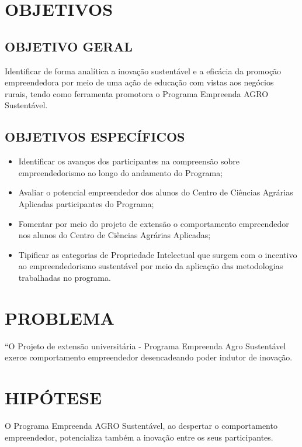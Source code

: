 \section{OBJETIVOS}

\subsection{OBJETIVO GERAL}

Identificar de forma analítica a inovação sustentável e a eficácia da promoção empreendedora por meio de uma ação de educação com vistas aos negócios rurais, tendo como ferramenta promotora o Programa Empreenda AGRO Sustentável.

\subsection{OBJETIVOS ESPECÍFICOS}

\begin{itemize}
\item{Identificar os avanços dos participantes na compreensão sobre empreendedorismo ao longo do andamento do Programa;}
\item {Avaliar o potencial empreendedor dos alunos do Centro de Ciências Agrárias Aplicadas participantes do Programa;}
\item {Fomentar por meio do projeto de extensão o comportamento empreendedor nos alunos do Centro de Ciências Agrárias Aplicadas;}
\item {Tipificar as categorias de Propriedade Intelectual que surgem com o incentivo ao empreendedorismo sustentável por meio da aplicação das metodologias trabalhadas no programa.}
\end{itemize}

\section{PROBLEMA}

“O Projeto de extensão universitária - Programa Empreenda Agro Sustentável exerce comportamento empreendedor desencadeando poder indutor de inovação.

\section{HIPÓTESE}

O Programa Empreenda AGRO Sustentável, ao despertar o comportamento empreendedor, potencializa também a inovação entre os seus participantes.



